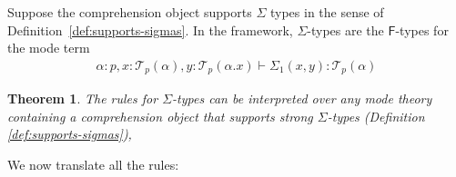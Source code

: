 \documentclass[10pt]{article}
\newtheorem{theorem}{Theorem}
\theoremstyle{definition}
\newcommand{\yields}{\vdash}
\newcommand\El[2]{\mathcal{T}_{#1}(#2)}
\begin{document}
Suppose the comprehension object supports $\Sigma$ types in the sense of Definition~\ref{def:supports-sigmas}. In the framework, $\Sigma$-types are the $\mathsf{F}$-types for the mode term
\begin{align*}
\alpha : p, x : \El{p}{\alpha}, y : \El{p}{\alpha.x} \yields \Sigma_1(x,y) : \El{p}{\alpha}
\end{align*}

\begin{theorem}
The rules for $\Sigma$-types can be interpreted over any mode theory containing a comprehension object that supports strong $\Sigma$-types (Definition \ref{def:supports-sigmas}), 
\end{theorem}

We now translate all the rules:
\end{document}
